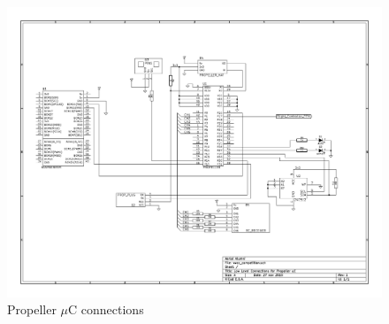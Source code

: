 \documentclass{article}
\begin{document}
\begin{figure}[t]
\caption{Propeller $\mu$C connections}
\includegraphics[height=\textwidth, angle=90]{vwcc_competition.pdf}
\end{figure}
\end{document}
